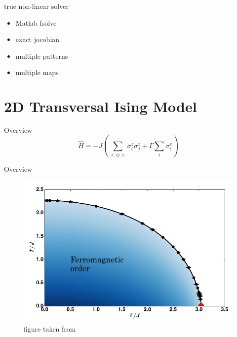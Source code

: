 \documentclass[aspectratio=169]{beamer}
\begin{document}
\begin{frame}{true non-linear solver}
    \begin{itemize}
        \item Matlab fsolve
        \item exact jocobian
        \item multiple patterns
        \item multiple maps
    \end{itemize}
\end{frame}

\section{2D Transversal Ising Model}

\begin{frame}{Overview}
    \begin{equation}
        \hat{H} = -J \left (  \sum_{<i j>} \sigma^z_i \sigma^z_j + \Gamma \sum_i \sigma^x_i \right )
    \end{equation}
\end{frame}

\begin{frame}{Overview}
    \begin{figure}
        \includegraphics[scale=0.5]{Figures/2disingphase.png}
        \caption{figure taken from \cite{PhysRevB.93.155157}}
    \end{figure}
\end{frame}
\end{document}
